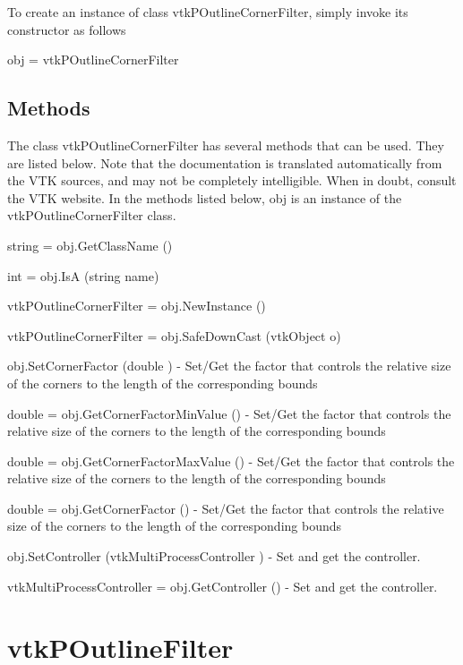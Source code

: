 To create an instance of class vtk\-P\-Outline\-Corner\-Filter, simply invoke its constructor as follows \begin{DoxyVerb}  obj = vtkPOutlineCornerFilter
\end{DoxyVerb}
 \hypertarget{vtkwidgets_vtkxyplotwidget_Methods}{}\subsection{Methods}\label{vtkwidgets_vtkxyplotwidget_Methods}
The class vtk\-P\-Outline\-Corner\-Filter has several methods that can be used. They are listed below. Note that the documentation is translated automatically from the V\-T\-K sources, and may not be completely intelligible. When in doubt, consult the V\-T\-K website. In the methods listed below, {\ttfamily obj} is an instance of the vtk\-P\-Outline\-Corner\-Filter class. 
\begin{DoxyItemize}
\item {\ttfamily string = obj.\-Get\-Class\-Name ()}  
\item {\ttfamily int = obj.\-Is\-A (string name)}  
\item {\ttfamily vtk\-P\-Outline\-Corner\-Filter = obj.\-New\-Instance ()}  
\item {\ttfamily vtk\-P\-Outline\-Corner\-Filter = obj.\-Safe\-Down\-Cast (vtk\-Object o)}  
\item {\ttfamily obj.\-Set\-Corner\-Factor (double )} -\/ Set/\-Get the factor that controls the relative size of the corners to the length of the corresponding bounds  
\item {\ttfamily double = obj.\-Get\-Corner\-Factor\-Min\-Value ()} -\/ Set/\-Get the factor that controls the relative size of the corners to the length of the corresponding bounds  
\item {\ttfamily double = obj.\-Get\-Corner\-Factor\-Max\-Value ()} -\/ Set/\-Get the factor that controls the relative size of the corners to the length of the corresponding bounds  
\item {\ttfamily double = obj.\-Get\-Corner\-Factor ()} -\/ Set/\-Get the factor that controls the relative size of the corners to the length of the corresponding bounds  
\item {\ttfamily obj.\-Set\-Controller (vtk\-Multi\-Process\-Controller )} -\/ Set and get the controller.  
\item {\ttfamily vtk\-Multi\-Process\-Controller = obj.\-Get\-Controller ()} -\/ Set and get the controller.  
\end{DoxyItemize}\hypertarget{vtkparallel_vtkpoutlinefilter}{}\section{vtk\-P\-Outline\-Filter}\label{vtkparallel_vtkpoutlinefilter}
